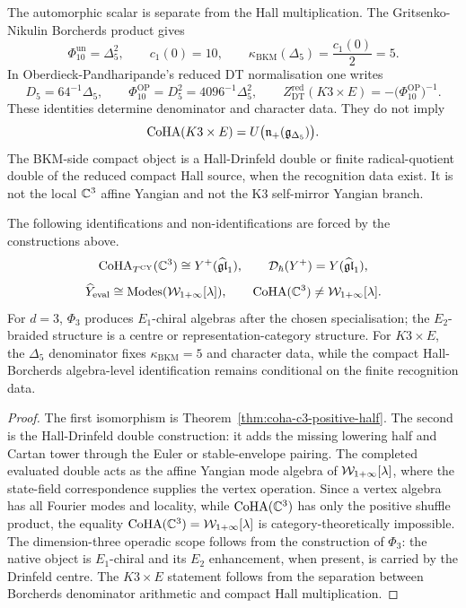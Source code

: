 The automorphic scalar is separate from the Hall multiplication.  The
Gritsenko-Nikulin Borcherds product gives
\[
  \Phi_{10}^{\mathrm{un}}=\Delta_5^2,
  \qquad
  c_1(0)=10,
  \qquad
  \kappa_{\mathrm{BKM}}(\Delta_5)=\frac{c_1(0)}2=5.
\]
In Oberdieck-Pandharipande's reduced DT normalisation one writes
\[
  D_5=64^{-1}\Delta_5,
  \qquad
  \Phi_{10}^{\mathrm{OP}}=D_5^2=4096^{-1}\Delta_5^2,
  \qquad
  Z^{\mathrm{red}}_{\mathrm{DT}}(K3\times E)
  =-\bigl(\Phi_{10}^{\mathrm{OP}}\bigr)^{-1}.
\]
These identities determine denominator and character data.  They do
not imply
\[
  \mathrm{CoHA}(K3\times E)
  =
  U\bigl(\mathfrak n_+(\mathfrak g_{\Delta_5})\bigr).
\]
The BKM-side compact object is a Hall-Drinfeld double or finite
radical-quotient double of the reduced compact Hall source, when the
recognition data exist.  It is not the local \(\mathbb{C}^3\) affine Yangian
and not the K3 self-mirror Yangian branch.

\begin{theorem}[Taxonomy]
\label{thm:coha-w-taxonomy}
The following identifications and non-identifications are forced by
the constructions above.
\[
\mathrm{CoHA}_{T^{\mathrm{CY}}}(\mathbb{C}^3)
\cong
Y^{+}(\widehat{\mathfrak{gl}}_1),
\qquad
\mathcal D_\hbar(Y^{+})
=
Y(\widehat{\mathfrak{gl}}_1),
\]
\[
\widehat{Y}_{\mathrm{eval}}
\cong
\operatorname{Modes}(\mathcal{W}_{1+\infty}[\lambda]),
\qquad
\mathrm{CoHA}(\mathbb{C}^3)\neq \mathcal{W}_{1+\infty}[\lambda].
\]
For \(d=3\), \(\Phi_3\) produces \(E_1\)-chiral algebras after the
chosen specialisation; the \(E_2\)-braided structure is a centre or
representation-category structure.  For \(K3\times E\), the
\(\Delta_5\) denominator fixes \(\kappa_{\mathrm{BKM}}=5\) and
character data, while the compact Hall-Borcherds algebra-level
identification remains conditional on the finite recognition data.
\end{theorem}

\begin{proof}
The first isomorphism is Theorem~\ref{thm:coha-c3-positive-half}.  The
second is the Hall-Drinfeld double construction: it adds the missing
lowering half and Cartan tower through the Euler or stable-envelope
pairing.  The completed evaluated double acts as the affine Yangian
mode algebra of \(\mathcal{W}_{1+\infty}[\lambda]\), where the state-field
correspondence supplies the vertex operation.  Since a vertex algebra
has all Fourier modes and locality, while \(\mathrm{CoHA}(\mathbb{C}^3)\) has only the
positive shuffle product, the equality \(\mathrm{CoHA}(\mathbb{C}^3)=\mathcal{W}_{1+\infty}[\lambda]\)
is category-theoretically impossible.  The dimension-three operadic
scope follows from the construction of \(\Phi_3\): the native object is
\(E_1\)-chiral and its \(E_2\) enhancement, when present, is carried by
the Drinfeld centre.  The \(K3\times E\) statement follows from the
separation between Borcherds denominator arithmetic and compact Hall
multiplication.
\end{proof}

